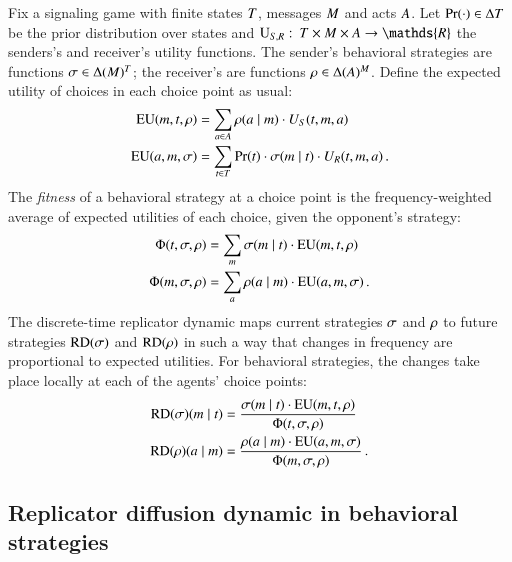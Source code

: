 \documentclass[fleqn,reqno,10pt]{article}
\newcommand{\RD}{\ensuremath{\mathrm{RD}}} %
\begin{document}
Fix a signaling game with finite states $T$, messages $M$
and acts $A$. Let $\Pr(\cdot) \in \Delta{\ensuremath{T}}$ be the prior
distribution over states and $\Util_{\sen,\rec} \mycolon \States
\times \Messgs \times \Acts \rightarrow \mathds{R}$ the senders's and
receiver's utility functions. The sender's behavioral strategies are
functions $\sigma \in \Delta(M)^T$; the receiver's are
functions $\rho \in \Delta(A)^M$. Define the expected
utility of choices in each choice point as usual:
\begin{align*}
  \mathrm{EU}(m, t, \rho) & = \sum_{a \in A}
  \rho(a \mid m) \cdot U_S(t, m, a) \\
  \mathrm{EU}(a, m, \sigma) & = \sum_{t \in
    T} \Pr(t) \cdot \sigma(m \mid t) \cdot
  U_R(t, m, a) \,.
\end{align*}
The \emph{fitness} of a behavioral strategy at a choice point is the
frequency-weighted average of expected utilities of each choice, given
the opponent's strategy:
\begin{align*}
  \Phi(t,\sigma, \rho) & = \sum_{m} \sigma(m \mid t) \cdot
\mathrm{EU}(m, t,\rho) \\
\Phi(m,\sigma, \rho) & = \sum_{a} \rho(a \mid m)
\cdot \mathrm{EU}(a, m,\sigma)\,.
\end{align*}
The discrete-time replicator dynamic maps current strategies $\sigma$
and $\rho$ to future strategies $\RD(\Sstrat)$ and $\RD(\Rstrat)$
in such a way that changes in frequency are proportional to expected
utilities. For behavioral strategies, the changes take place locally
at each of the agents' choice points:
\begin{align*}
  \RD(\Sstrat)(\messg \probbar \state) & = \frac{\Sstrat(\messg \probbar \state) \cdot
    \EU(\messg, \state,\Rstrat)} {\Phi(\state,\Sstrat, \Rstrat)} \\
    \RD(\Rstrat)(\act \probbar \messg) & = \frac{\Rstrat(\act \probbar \messg) \cdot
    \EU(\act, \messg,\Sstrat)} {\Phi(\messg,\Sstrat, \Rstrat)}  \,.
\end{align*}


\subsection{Replicator diffusion dynamic in behavioral strategies}
\label{sec:repl-diff-dynam-1}
\end{document}
